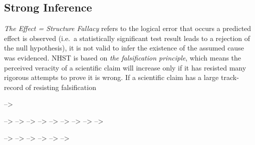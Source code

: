 \documentclass[12pt,]{book}
\begin{document}
\hypertarget{strong-inference}{%
\subsection*{Strong Inference}\label{strong-inference}}

\emph{The Effect = Structure Fallacy} refers to the logical error that occurs a predicted effect is observed (i.e.~a statistically significant test result leads to a rejection of the null hypothesis), it is not valid to infer the existence of the assumed cause was evidenced. NHST is based on \emph{the falsification principle}, which means the perceived veracity of a scientific claim will increase only if it has resisted many rigorous attempts to prove it is wrong. If a scientific claim has a large track-record of resisting falsification

\begin{table}[t]

\caption{\label{tab:stronInf}Strong Inference according to @platt1964strong }
\centering
{}
\end{table}

--\textgreater{}

--\textgreater{}
 --\textgreater{}
 --\textgreater{}
 --\textgreater{}
 --\textgreater{}
 --\textgreater{}
 --\textgreater{}
 --\textgreater{}
 --\textgreater{}

--\textgreater{}
 --\textgreater{}
 --\textgreater{}
 --\textgreater{}
 --\textgreater{}
 --\textgreater{}
\end{document}
